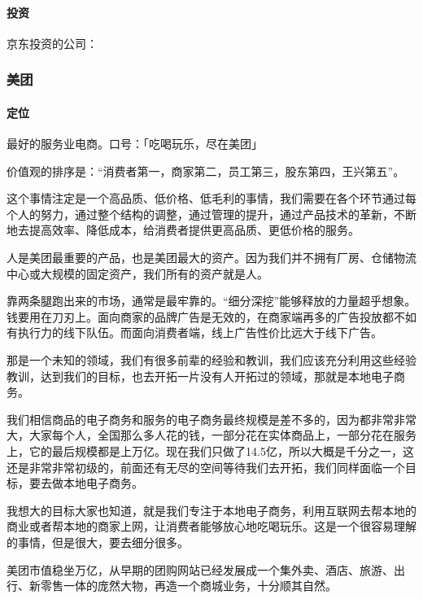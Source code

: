 \documentclass[letterpaper,11pt,english]{sphinxmanual}
\begin{document}
\paragraph{投资}
\label{\detokenize{chapter_company/jd:id9}}
京东投资的公司：


\subsubsection{美团}
\label{\detokenize{chapter_company/meituan:id1}}\label{\detokenize{chapter_company/meituan::doc}}

\paragraph{定位}
\label{\detokenize{chapter_company/meituan:id2}}
最好的服务业电商。口号：「吃喝玩乐，尽在美团」

价值观的排序是：“消费者第一，商家第二，员工第三，股东第四，王兴第五”。

这个事情注定是一个高品质、低价格、低毛利的事情，我们需要在各个环节通过每个人的努力，通过整个结构的调整，通过管理的提升，通过产品技术的革新，不断地去提高效率、降低成本，给消费者提供更高品质、更低价格的服务。

人是美团最重要的产品，也是美团最大的资产。因为我们并不拥有厂房、仓储物流中心或大规模的固定资产，我们所有的资产就是人。

靠两条腿跑出来的市场，通常是最牢靠的。“细分深挖”能够释放的力量超乎想象。钱要用在刀刃上。面向商家的品牌广告是无效的，在商家端再多的广告投放都不如有执行力的线下队伍。而面向消费者端，线上广告性价比远大于线下广告。

那是一个未知的领域，我们有很多前辈的经验和教训，我们应该充分利用这些经验教训，达到我们的目标，也去开拓一片没有人开拓过的领域，那就是本地电子商务。

我们相信商品的电子商务和服务的电子商务最终规模是差不多的，因为都非常非常大，大家每个人，全国那么多人花的钱，一部分花在实体商品上，一部分花在服务上，它的最后规模都是上万亿。现在我们只做了14.5亿，所以大概是千分之一，这还是非常非常初级的，前面还有无尽的空间等待我们去开拓，我们同样面临一个目标，要去做本地电子商务。

我想大的目标大家也知道，就是我们专注于本地电子商务，利用互联网去帮本地的商业或者帮本地的商家上网，让消费者能够放心地吃喝玩乐。这是一个很容易理解的事情，但是很大，要去细分很多。

美团市值稳坐万亿，从早期的团购网站已经发展成一个集外卖、酒店、旅游、出行、新零售一体的庞然大物，再造一个商城业务，十分顺其自然。%
\begin{footnote}[904]\sphinxAtStartFootnote
{}
%
\end{footnote}
\end{document}
